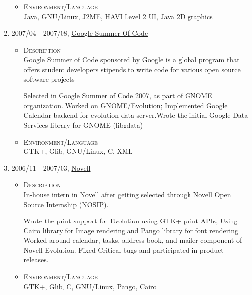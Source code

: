 \documentclass[a4paper,10pt]{article}
\begin{document}
\begin{enumerate}
\begin{itemize}
    \item \textsc{Environment/Language} \\  
      Java, GNU/Linux, J2ME, HAVI Level 2 UI, Java 2D graphics

   \end{itemize}

\item \textsc{2007/04} - \textsc{2007/08}, \href{https://developers.google.com/open-source/gsoc/2007/}{Google Summer Of Code} \\
  \begin {itemize}
  \item \textsc{Description} \\
  Google Summer of Code sponsored by Google is a global program that offers student
  developers stipends to write code for various open source software projects

  Selected in Google Summer of Code 2007, as part of GNOME organization.
  Worked on GNOME/Evolution; Implemented Google Calendar backend for evolution data server.Wrote the initial Google Data Services library for GNOME (libgdata)

\item \textsc{Environment/Language} \\
  GTK+, Glib, GNU/Linux, C, XML  
  \end {itemize}

\item \textsc{2006/11 - 2007/03}, \href{www.novell.com}{Novell} \\
  \begin {itemize}
  \item \textsc{Description} \\
  
  In-house intern in Novell after getting selected through Novell Open Source Internship (NOSIP).
 
  Wrote the print support for Evolution using GTK+ print APIs, Using Cairo library for Image rendering and Pango library for font rendering
  Worked around calendar, tasks, address book, and mailer component of Novell Evolution.
  Fixed Critical bugs and participated in product releases.
\item \textsc{Environment/Language} \\
  GTK+, Glib, C, GNU/Linux, Pango, Cairo
  \end {itemize}
\end{enumerate}

\end{document}
